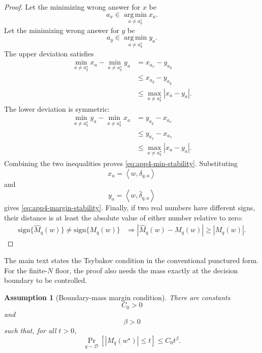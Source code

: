 \documentclass{article} %
\newtheorem{assumption}{Assumption}
\providecommand{\argmin}{\mathop{\mathrm{arg\,min}}\limits}
\providecommand{\D}{\mathcal{D}}
\providecommand{\Mhat}{\widehat{M}}
\providecommand{\wstar}{w^{\star}}
\begin{document}
\begin{proof}
Let the minimizing wrong answer for \(x\) be
\begin{equation}
\label{eq:app4-argmin-x}
a_x
\in
\argmin_{a\ne a_q^\star}x_a .
\end{equation}
Let the minimizing wrong answer for \(y\) be
\begin{equation}
\label{eq:app4-argmin-y}
a_y
\in
\argmin_{a\ne a_q^\star}y_a .
\end{equation}
The upper deviation satisfies
\begin{align}
\min_{a\ne a_q^\star}x_a-\min_{a\ne a_q^\star}y_a
&=
x_{a_x}-y_{a_y}
\label{eq:app4-min-proof-a}
\\
&\le
x_{a_y}-y_{a_y}
\label{eq:app4-min-proof-b}
\\
&\le
\max_{a\ne a_q^\star}|x_a-y_a|.
\label{eq:app4-min-proof-c}
\end{align}
The lower deviation is symmetric:
\begin{align}
\min_{a\ne a_q^\star}y_a-\min_{a\ne a_q^\star}x_a
&=
y_{a_y}-x_{a_x}
\label{eq:app4-min-proof-d}
\\
&\le
y_{a_x}-x_{a_x}
\label{eq:app4-min-proof-e}
\\
&\le
\max_{a\ne a_q^\star}|x_a-y_a|.
\label{eq:app4-min-proof-f}
\end{align}
Combining the two inequalities proves \eqref{eq:app4-min-stability}.  Substituting
\begin{equation}
\label{eq:app4-substitute-x}
x_a
=
\left\langle w,\delta_{q,a}\right\rangle
\end{equation}
and
\begin{equation}
\label{eq:app4-substitute-y}
y_a
=
\left\langle w,\widehat{\delta}_{q,a}\right\rangle
\end{equation}
gives \eqref{eq:app4-margin-stability}.  Finally, if two real numbers have different signs, their distance is at least the absolute value of either number relative to zero:
\begin{align}
\mathrm{sign}\{\Mhat_q(w)\}
\ne
\mathrm{sign}\{M_q(w)\}
&\Longrightarrow
\left|\Mhat_q(w)-M_q(w)\right|
\ge
|M_q(w)|.
\label{eq:app4-sign-proof}
\end{align}
\end{proof}

The main text states the Tsybakov condition in the conventional punctured form.  For the finite-\(N\) floor, the proof also needs the mass exactly at the decision boundary to be controlled.

\begin{assumption}[Boundary-mass margin condition]
\label{ass:4}
There are constants
\begin{equation}
\label{eq:app4-C0}
C_0>0
\end{equation}
and
\begin{equation}
\label{eq:app4-beta0}
\beta>0
\end{equation}
such that, for all \(t>0\),
\begin{equation}
\label{eq:app4-boundary-mass}
\Pr_{q\sim\D}\!\left[
|M_q(\wstar)|\le t
\right]
\le
C_0t^\beta .
\end{equation}
\end{assumption}
\end{document}
